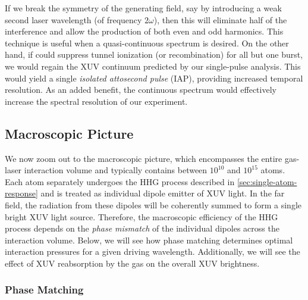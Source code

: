 If we break the symmetry of the generating field, say by introducing a weak second laser wavelength (of frequency $2 \omega$), then this will eliminate half of the interference and allow the production of both even and odd harmonics. This technique is useful when a quasi-continuous spectrum is desired. On the other hand, if could suppress tunnel ionization (or recombination) for all but one burst, we would regain the XUV continuum predicted by our single-pulse analysis. This would yield a single \textit{isolated attosecond pulse} (IAP), providing increased temporal resolution. As an added benefit, the continuous spectrum would effectively increase the spectral resolution of our experiment.

\subsection{Macroscopic Picture}

We now zoom out to the macroscopic picture, which encompasses the entire gas-laser interaction volume and typically contains between $10^{10}$ and $10^{15}$ atoms. Each atom separately undergoes the HHG process described in \cref{sec:single-atom-response} and is treated as individual dipole emitter of XUV light. In the far field, the radiation from these dipoles will be coherently summed to form a single bright XUV light source. Therefore, the macroscopic efficiency of the HHG process depends on the \textit{phase mismatch} of the individual dipoles across the interaction volume. Below, we will see how phase matching determines optimal interaction pressures for a given driving wavelength. Additionally, we will see the effect of XUV reabsorption by the gas on the overall XUV brightness.

\subsubsection{Phase Matching}
\label{sec:phase-matching}


